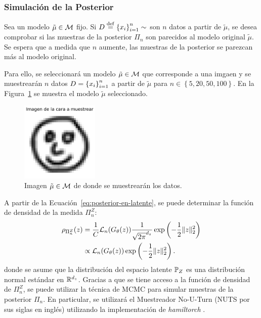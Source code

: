 \subsubsection{Simulación de la Posterior}\label{sssec:sim-posterior}  %

Sea un modelo $\tilde\mu\in \operatorname{\mathcal{M}}$ fijo. Si $D \stackrel{\mathrm{def}}{=} \left\{ x_i \right\}_{i=1}^n \sim$ son $n$ datos a partir de $\tilde\mu$, se desea comprobar si las muestras de la posterior $\Pi_n$ son parecidos al modelo original $\tilde\mu$. Se espera que a medida que $n$ aumente, las muestras de la posterior se parezcan más al modelo original.

Para ello, se seleccionará un modelo $\tilde\mu\in \operatorname{\mathcal{M}}$ que corresponde a una imgaen y se muestrearán $n$ datos $D = \left\{ x_i \right\}_{i=1}^n$ a partir de $\tilde\mu$ para $n\in\left\{ 5, 20, 50, 100 \right\}$.
En la Figura~\ref{fig:image-sampler-i-37} se muestra el modelo $\tilde\mu$ seleccionado.
\begin{figure}[H]
    \centering
    \includegraphics[width=0.33\textwidth]{img/mcmc/image-sampler-i-37.pdf}
    \caption{Imagen $\tilde\mu\in \operatorname{\mathcal{M}}$ de donde se muestrearán los datos.}
    \label{fig:image-sampler-i-37}
\end{figure}

A partir de la Ecuación~\ref{eq:posterior-en-latente}, se puede determinar la función de densidad de la medida $\Pi^Z_n$:
\begin{align}
    \rho_{\Pi^Z_n}(z)
     & = \frac{1}{C} \mathcal{L}_n(G_\theta(z)) \frac{1}{\sqrt{2\pi}^{d_z}} \exp\left( -\frac{1}{2} \| z \|_2^2 \right)         \\
     & \propto \mathcal{L}_n(G_\theta(z)) \exp\left( -\frac{1}{2} \| z \|_2^2 \right). \label{eq:posterior-en-latente-densidad}
\end{align}
donde se asume que la distribución del espacio latente $\Prob_Z$ es una distribución normal estándar en $\mathbb{R}^{d_z}$.
Gracias a que se tiene acceso a la función de densidad de $\Pi^Z_n$, se puede utilizar la técnica de MCMC para simular muestras de la posterior $\Pi_n$. En particular, se utilizará el Muestreador No-U-Turn (NUTS por sus siglas en inglés) \cite{hoffman2014no} utilizando la implementación de \textit{hamiltorch} \cite{cobb2019introducing}.

